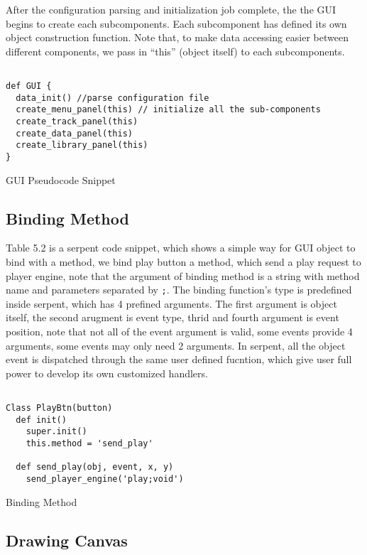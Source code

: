 After the configuration parsing and initialization job complete, the 
the GUI begins to create each subcomponents. Each subcomponent has defined its 
own object construction function. Note that,  to make data accessing easier 
between different components, we pass in ``this'' (object itself) to each  
subcomponents.
\begin{table}[htdp]
\centering
\begin{lstlisting}

def GUI {
  data_init() //parse configuration file
  create_menu_panel(this) // initialize all the sub-components
  create_track_panel(this)
  create_data_panel(this)
  create_library_panel(this)
}

\end{lstlisting}
\caption[GUI Pseudocode Snippet]{GUI Pseudocode Snippet}
\end{table}

\subsection{Binding Method}
Table 5.2 is a serpent code snippet, which shows a simple way for GUI object 
to bind with a method, we bind play button a method, which send a play 
request to player engine, note that
the argument of binding method is a string with method name and parameters
separated by \texttt{;}. The binding function's type is predefined inside 
serpent, which has 4 prefined arguments. The first argument is object itself, 
the second arugment is event type, thrid and fourth argument is event position,
note that not all of the event argument is valid, some events provide 4 arguments, 
some events may only need 2 arguments. In serpent, all the object event is 
dispatched through the same user defined fucntion, which give user full power 
to develop its own customized handlers.

\begin{table}[htdp]
\centering
\begin{lstlisting}

Class PlayBtn(button)
  def init()
    super.init()
    this.method = 'send_play'

  def send_play(obj, event, x, y)
    send_player_engine('play;void')

\end{lstlisting}
\caption[Binding Method]{Binding Method}
\end{table}

\subsection{Drawing Canvas}
 
